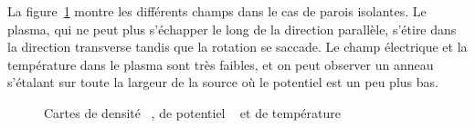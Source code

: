 \begin{refsection}
La figure~\ref{CybeleCartesIsolant} montre les différents champs dans le cas de
parois isolantes. Le plasma, qui ne peut plus s'échapper le long de la direction
parallèle, s'étire dans la direction transverse tandis que la rotation se
saccade.
Le champ électrique et la température dans le plasma sont très faibles, et on
peut observer un anneau s'étalant sur toute la largeur de la source où le
potentiel est un peu plus bas.

\begin{figure}[!htbp]
  \centering
    \caption{Cartes de densité ~, de
    potentiel ~ et de
    température }
    \label{CybeleCartesIsolant}
\end{figure}		


\end{refsection}
